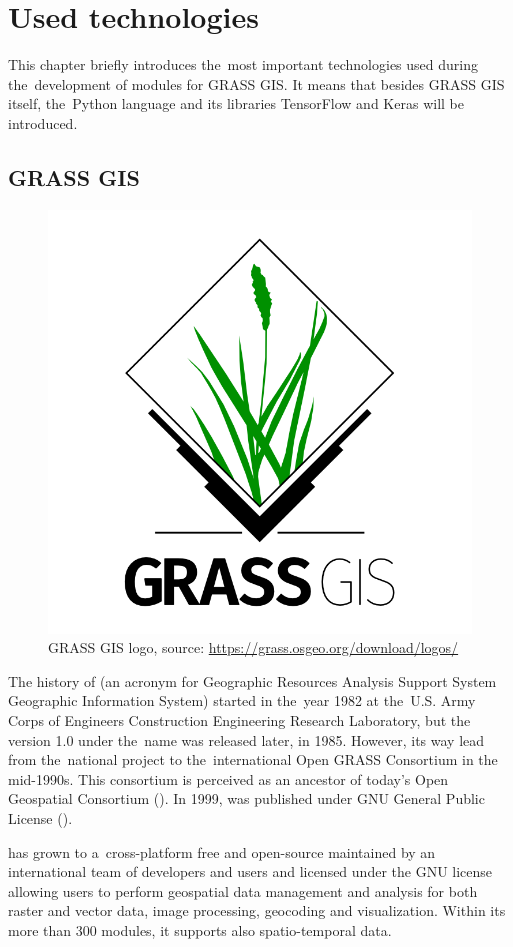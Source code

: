 \chapter{Used technologies}
\label{technologies}

This chapter briefly introduces the~most important technologies used during
the~development of modules for GRASS GIS. It means that besides GRASS GIS itself, 
the~Python language and its libraries TensorFlow and Keras will be introduced.

\section{GRASS GIS}
\label{grass}

\begin{figure}[H]
   \centering
	\includegraphics[width=0.4\linewidth]{./pictures/grass-logo.png}
	\caption[GRASS GIS logo]{GRASS GIS logo, source: \url{https://grass.osgeo.org/download/logos/}}
      \label{fig:grass-logo}
\end{figure}

The history of   (an acronym for Geographic Resources Analysis 
Support System Geographic Information System) started in the~year 1982 at the~U.S. 
Army Corps of Engineers Construction Engineering Research Laboratory, but the~
version 1.0 under the~name  was released later, in 1985. However, its 
way lead from the~national project to the~international Open GRASS Consortium in 
the mid-1990s. This consortium is perceived as an ancestor of today's Open 
Geospatial Consortium (). In 1999,   was published 
under GNU General Public License ().

  has grown to a~cross-platform free and open-source  
maintained by an international team of developers and users and licensed under 
the GNU  license allowing users to perform geospatial data management 
and analysis for both raster and vector data, image processing, geocoding and
visualization. Within its more than 300 modules, it supports also 
spatio-temporal data.

